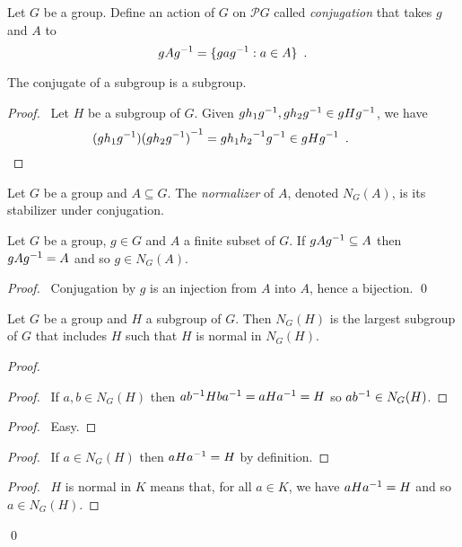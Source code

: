 \begin{df}[Conjugation]
Let $G$ be a group. Define an action of $G$ on $\mathcal{P} G$ called \emph{conjugation} that takes $g$ and $A$ to
\[ gA{g}^{-1} = \{ ga{g}^{-1} : a \in A \} \enspace . \]
\end{df}

\begin{prop}
The conjugate of a subgroup is a subgroup.
\end{prop}

\begin{proof}
\pf\ Let $H$ be a subgroup of $G$. Given $gh_1{g}^{-1},gh_2{g}^{-1} \in gH{g}^{-1}$, we have
\[ (gh_1{g}^{-1}){(gh_2{g}^{-1})}^{-1} = gh_1{h_2}^{-1}{g}^{-1} \in gH{g}^{-1} \enspace . \qquad \relax \]
\end{proof}

\begin{df}[Normalizer]
Let $G$ be a group and $A \subseteq G$. The \emph{normalizer} of $A$, denoted $N_G(A)$, is its stabilizer under conjugation.
\end{df}

\begin{prop}
Let $G$ be a group, $g \in G$ and $A$ a finite subset of $G$. If $gA{g}^{-1} \subseteq A$ then $gA{g}^{-1} = A$ and so $g \in N_G(A)$.
\end{prop}

\begin{proof}
\pf\ Conjugation by $g$ is an injection from $A$ into $A$, hence a bijection. \qed
\end{proof}


\begin{prop}
\label{prop:H-normal-in-NGH}
Let $G$ be a group and $H$ a subgroup of $G$. Then $N_G(H)$ is the largest subgroup of $G$ that includes $H$ such that $H$ is normal in $N_G(H)$.
\end{prop}

\begin{proof}
\pf
{}
\begin{proof}
	\pf\ If $a,b \in N_G(H)$ then $a{b}^{-1}Hb{a}^{-1} = aH{a}^{-1} = H$ so $a{b}^{-1} \in N_G(H)$.
\end{proof}
\begin{proof}
	\pf\ Easy.
\end{proof}
\begin{proof}
	\pf\ If $a \in N_G(H)$ then $aH{a}^{-1} = H$ by definition.
\end{proof}
\begin{proof}
	\pf\ $H$ is normal in $K$ means that, for all $a \in K$, we have $aH{a}^{-1} = H$ and so $a \in N_G(H)$.
\end{proof}
\qed
\end{proof}

